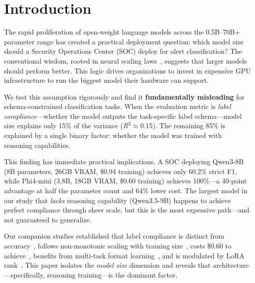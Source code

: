 \documentclass[review,3p]{elsarticle}
\begin{document}
\section{Introduction}

The rapid proliferation of open-weight language models across the 0.5B--70B+ parameter range has created a practical deployment question: which model size should a Security Operations Center (SOC) deploy for alert classification? The conventional wisdom, rooted in neural scaling laws~\cite{kaplan2020}, suggests that larger models should perform better. This logic drives organizations to invest in expensive GPU infrastructure to run the biggest model their hardware can support.

We test this assumption rigorously and find it \textbf{fundamentally misleading} for schema-constrained classification tasks. When the evaluation metric is \emph{label compliance}---whether the model outputs the task-specific label schema---model size explains only 15\% of the variance ($R^2 \approx 0.15$). The remaining 85\% is explained by a single binary factor: whether the model was trained with reasoning capabilities.

This finding has immediate practical implications. A SOC deploying Qwen3-8B (8B parameters, 26GB VRAM, \$0.94 training) achieves only 60.2\% strict F1, while Phi4-mini (3.8B, 18GB VRAM, \$0.60 training) achieves 100\%---a 40-point advantage at half the parameter count and 64\% lower cost. The largest model in our study that \emph{lacks} reasoning capability (Qwen3.5-9B) happens to achieve perfect compliance through sheer scale, but this is the most expensive path---and not guaranteed to generalize.

Our companion studies established that label compliance is distinct from accuracy~\cite{p3}, follows non-monotonic scaling with training size~\cite{p6}, costs \$0.60 to achieve~\cite{p7}, benefits from multi-task format learning~\cite{p15}, and is modulated by LoRA rank~\cite{p22}. This paper isolates the \emph{model size} dimension and reveals that architecture---specifically, reasoning training---is the dominant factor.
\end{document}

